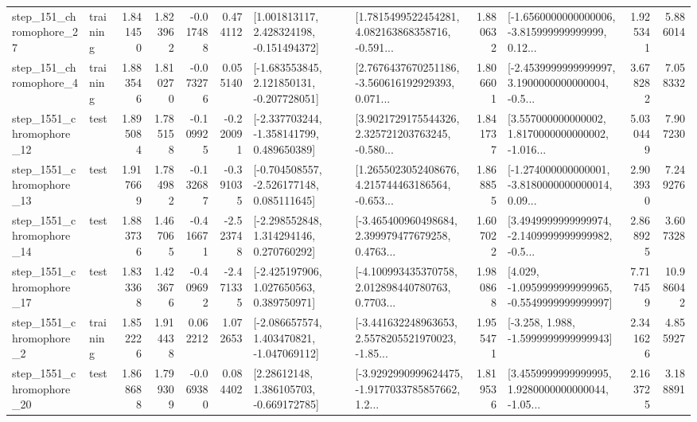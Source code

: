 \begin{tabular}{llrrrrllrlrr}
  step\_151\_chromophore\_27 &  training &      1.841450 &    1.823962 &     -0.017488 &  0.474112 &    [1.001813117, 2.428324198, -0.151494372] &  [1.7815499522454281, 4.082163868358716, -0.591... &       1.880632 &  [-1.6560000000000006, -3.815999999999999, 0.12... &            1.925341 &          5.886014 \\
   step\_151\_chromophore\_4 &  training &      1.883546 &    1.810270 &     -0.073276 &  0.055140 &   [-1.683553845, 2.121850131, -0.207728051] &  [2.7676437670251186, -3.560616192929393, 0.071... &       1.806601 &  [-2.4539999999999997, 3.1900000000000004, -0.5... &            3.678282 &          7.058332 \\
 step\_1551\_chromophore\_12 &      test &      1.895084 &    1.785158 &     -0.109925 & -0.220091 &   [-2.337703244, -1.358141799, 0.489650389] &  [3.9021729175544326, 2.325721203763245, -0.580... &       1.841737 &  [3.557000000000002, 1.8170000000000002, -1.016... &            5.030449 &          7.907230 \\
 step\_1551\_chromophore\_13 &      test &      1.917669 &    1.784982 &     -0.132687 & -0.391035 &   [-0.704508557, -2.526177148, 0.085111645] &  [1.2655023052408676, 4.215744463186564, -0.653... &       1.868855 &  [-1.274000000000001, -3.8180000000000014, 0.09... &            2.903930 &          7.249276 \\
 step\_1551\_chromophore\_14 &      test &      1.883736 &    1.467065 &     -0.416671 & -2.523748 &    [-2.298552848, 1.314294146, 0.270760292] &  [-3.465400960498684, 2.399979477679258, 0.4763... &       1.607022 &  [3.4949999999999974, -2.1409999999999982, -0.5... &            2.868925 &          3.607328 \\
 step\_1551\_chromophore\_17 &      test &      1.833368 &    1.423676 &     -0.409692 & -2.471335 &    [-2.425197906, 1.027650563, 0.389750971] &  [-4.100993435370758, 2.012898440780763, 0.7703... &       1.980868 &  [4.029, -1.0959999999999965, -0.5549999999999997] &            7.717459 &         10.986042 \\
  step\_1551\_chromophore\_2 &  training &      1.852226 &    1.914438 &      0.062212 &  1.072653 &   [-2.086657574, 1.403470821, -1.047069112] &  [-3.441632248963653, 2.5578205521970023, -1.85... &       1.955471 &               [-3.258, 1.988, -1.5999999999999943] &            2.341626 &          4.855927 \\
 step\_1551\_chromophore\_20 &      test &      1.868688 &    1.799309 &     -0.069380 &  0.084402 &     [2.28612148, 1.386105703, -0.669172785] &  [-3.9292990999624475, -1.9177033785857662, 1.2... &       1.819536 &  [3.4559999999999995, 1.9280000000000044, -1.05... &            2.163725 &          3.188891 \\

\end{tabular}
